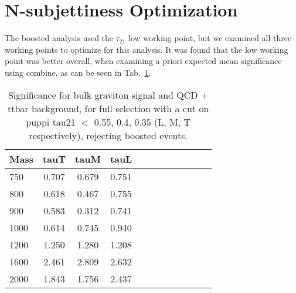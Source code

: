 \section{N-subjettiness Optimization\label{app:tau21}}

The boosted analysis used the $\tau_{21}$ low working point, but we examined all three working points to optimize for this analysis. It was found that the low working point was better overall, when examining a priori expected mean significance using combine, as can be seen in Tab.~\ref{tab:tau21opt}. 

\begin{table}[h]
\begin{tabular}{|l|c|c|c|c|c|c|c|c|c|c|c|}
\hline
Mass & tauT & tauM & tauL \\ \hline
750 &  0.707&  0.679& 0.751 \\
800 &  0.618&  0.467& 0.755 \\
900 &  0.583&  0.312& 0.741 \\
1000 &  0.614&  0.745& 0.940\\
1200 &  1.250&  1.280& 1.208 \\ 
1600 &  2.461&  2.809& 2.632\\
2000 &  1.843&  1.756& 2.437\\
\hline
\end{tabular}
\caption{Significance for bulk graviton signal and QCD + ttbar background, for full selection with a cut on puppi tau21 $<$ 0.55, 0.4, 0.35 (L, M, T respectively), rejecting boosted events.}\label{tab:tau21opt}
\end{table}
